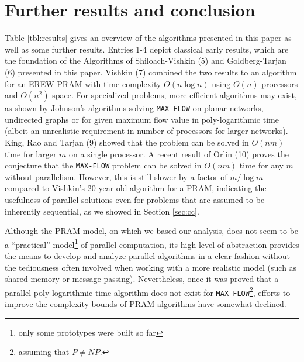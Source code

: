 \documentclass[a4paper,10pt, twocolumn]{article}
\begin{document}
\section{Further results and conclusion}
\label{sec:further}
Table \ref{tbl:results} gives an overview of the algorithms presented in this paper as well as some further results. Entries 1-4 depict classical early results, which are the foundation of the Algorithms of Shiloach-Vishkin (5) and Goldberg-Tarjan (6) presented in this paper.  Vishkin (7) combined the two results to an algorithm for an EREW PRAM with time complexity $O(n \log n)$ using $O(n)$ processors and $O(n^{2})$ space. For specialized problems, more efficient algorithms may exist, as shown by Johnson's algorithms solving \lstinline|MAX-FLOW| on planar networks, undirected graphs or for  given maximum flow value in poly-logarithmic time (albeit an unrealistic requirement in number of processors for larger networks). King, Rao and Tarjan (9) showed that the problem can be solved in $O(nm)$ time for larger $m$ on a single processor. A recent result of Orlin (10) proves the conjecture that the \lstinline|MAX-FLOW| problem can be solved in $O(nm)$ time for any $m$ without parallelism. However, this is still slower by a factor of $m/ \log m$ compared to Vishkin's\cite{vishkin92} 20 year old algorithm for a PRAM, indicating the usefulness of parallel solutions even for problems that are assumed to be inherently sequential, as we showed in Section \ref{sec:cc}.

Although the PRAM model, on which we based our analysis, does not seem to be a ``practical'' model\footnote{only some prototypes were built so far} of parallel computation, its high level of abstraction provides the means to develop and analyze parallel algorithms in a clear fashion without the tediousness often involved when working with a more realistic model (such as shared memory or message passing).  Nevertheless, once it was proved that a parallel poly-logarithmic time algorithm does not exist for \lstinline|MAX-FLOW|\footnote{assuming that $P \neq NP$.}, efforts to improve the complexity bounds of PRAM algorithms have somewhat declined.


\printbibliography
\end{document}
